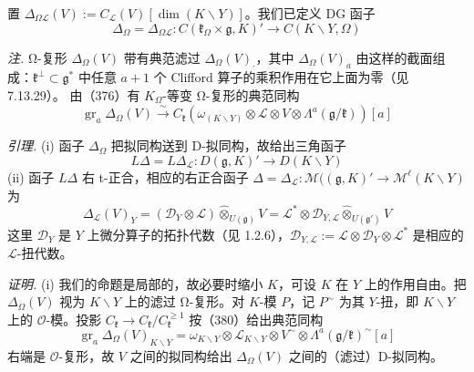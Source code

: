 置 $\Delta_{\Omega\mathcal{L}}(V):=C_{\mathcal{L}}(V)[\dim(K\backslash Y)]$。我们已定义 DG 函子
\begin{equation}\tag{379}
\Delta_{\Omega}=\Delta_{\Omega\mathcal{L}}:C(\mathfrak{k}_{\Omega}\times\mathfrak{g},K)'\longrightarrow C(K\backslash Y,\Omega)
\end{equation}

 \emph{注.} Ω-复形 $\Delta_{\Omega}(V)$ 带有典范滤过 $\Delta_{\Omega}(V)_{\cdot}$，其中 $\Delta_{\Omega}(V)_a$ 由这样的截面组成：$\mathfrak{k}^{\perp}\subset\mathfrak{g}^{*}$ 中任意 $a+1$ 个 Clifford 算子的乘积作用在它上面为零（见 7.13.29）。%
由（376）有 $K_{\Omega}$-等变 Ω-复形的典范同构
\begin{equation}\tag{380}
\operatorname{gr}_a\Delta_{\Omega}(V)\xrightarrow{\ \sim\ }C_{\mathfrak{k}}(\omega_{(K\backslash Y)}\otimes\mathcal{L}\otimes V\otimes\Lambda^{a}(\mathfrak{g}/\mathfrak{k}))[a]
\end{equation}

 \emph{引理.} (i) 函子 $\Delta_{\Omega}$ 把拟同构送到 D-拟同构，故给出三角函子
\begin{equation}\tag{381}
L\Delta=L\Delta_{\mathcal{L}}:D(\mathfrak{g},K)'\to D(K\backslash Y)
\end{equation}
(ii) 函子 $L\Delta$ 右 t-正合，相应的右正合函子 $\Delta=\Delta_{\mathcal{L}}:\mathcal{M}((\mathfrak{g},K)'\to\mathcal{M}^{\ell}(K\backslash Y)$ 为
\begin{equation}\tag{382}
\Delta_{\mathcal{L}}(V)_Y=(\mathcal{D}_Y\otimes\mathcal{L})\widehat{\otimes}_{U(\mathfrak{g})}V=\mathcal{L}^{*}\otimes\mathcal{D}_{Y,\mathcal{L}}\widehat{\otimes}_{U(\mathfrak{g}')}V
\end{equation}
这里 $\mathcal{D}_Y$ 是 $Y$ 上微分算子的拓扑代数（见 1.2.6），$\mathcal{D}_{Y,\mathcal{L}}:=\mathcal{L}\otimes\mathcal{D}_Y\otimes\mathcal{L}^{*}$ 是相应的 $\mathcal{L}$-扭代数。%

\emph{证明.} (i) 我们的命题是局部的，故必要时缩小 $K$，可设 $K$ 在 $Y$ 上的作用自由。把 $\Delta_{\Omega}(V)$ 视为 $K\backslash Y$ 上的滤过 Ω-复形。对 $K$-模 $P$，记 $P^{\sim}$ 为其 $Y$-扭，即 $K\backslash Y$ 上的 $\mathcal{O}$-模。投影 $C_{\mathfrak{k}}\to C_{\mathfrak{k}}/C_{\mathfrak{k}}^{\ge1}$ 按（380）给出典范同构
\begin{equation}\tag{383}
\operatorname{gr}_a\Delta_{\Omega}(V)_{K\backslash Y}=\omega_{K\backslash Y}\otimes\mathcal{L}_{K\backslash Y}\otimes V^{\sim}\otimes\Lambda^{a}(\mathfrak{g}/\mathfrak{k})^{\sim}[a]
\end{equation}
右端是 $\mathcal{O}$-复形，故 $V$ 之间的拟同构给出 $\Delta_{\Omega}(V)$ 之间的（滤过）D-拟同构。

